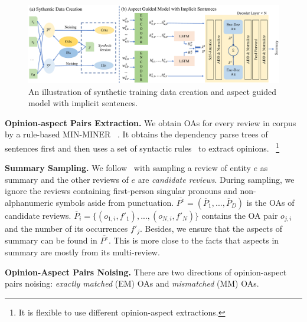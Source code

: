 \begin{figure}[th]
	\centering
	\includegraphics[scale=0.48]{./dm.pdf}
	\caption{An illustration of synthetic training data creation and aspect guided model with implicit sentences.}
	\label{fig:dm}
\end{figure}

\textbf{Opinion-aspect Pairs Extraction.} 
We obtain OAs for every review in corpus by a rule-based
MIN-MINER~\cite{basicOpiMin20} . 
It obtains the dependency
parse trees of sentences first and then uses a set of syntactic rules~\cite{aspect12} to extract opinions.
~\footnote{It is flexible to use different opinion-aspect extractions.}

\textbf{Summary Sampling.} 
We follow~\citet{Denoise20} 
with sampling a review of entity $e$ as {\em} summary  and the other reviews of $e$ are {\em candidate reviews}.
During sampling, we ignore the reviews containing first-person singular pronouns
and non-alphanumeric symbols aside from punctuation.
$\overline{P^e}=(\overline{P}_{1},...,\overline{P}_{D})$ is the OAs of candidate reviews.
$\overline{P}_{i}=\{(o_{1,i},f'_1), ..., (o_{N, i},f'_{N})\}$ contains
the OA pair $o_{j,i}$ and the number of its occurrences $f'_j$.
Besides, 
we ensure that 
the aspects of summary 
can be found in $\overline{P^e}$.
This is more close to the facts that aspects in summary are mostly
 from its multi-review.

\textbf{Opinion-Aspect Pairs Noising.}
There are two directions of opinion-aspect pairs noising: 
{\em exactly matched} (EM) OAs and {\em mismatched} (MM) OAs.

